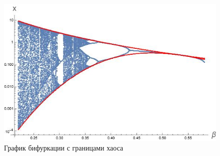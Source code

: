 \documentclass[14pt]{extarticle}
\begin{document}
        \begin{figure}[ht]
            \centering
            \includegraphics[width=\textwidth]{images/bifurcation_chaos.jpg}
            \caption{График бифуркации с границами хаоса}
        \end{figure}
\end{document}
